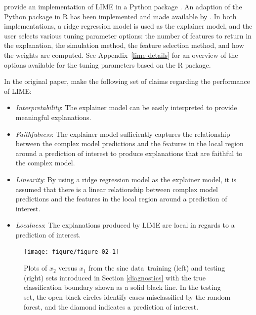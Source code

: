 \documentclass[AMS,STIX2COL]{WileyNJD-v2}\usepackage[]{graphicx}\usepackage[]{color}
\newenvironment{knitrout}{}{} %
\newcommand{\data}{sine data}
\begin{document}
\citet{ribeiro:2016} provide an implementation of LIME in a Python package \cite{ribeiro:2020}. An adaption of the Python package in R has been implemented and made available by \citet{pedersen:2020}. In both implementations, a ridge regression model is used as the explainer model, and the user  selects various tuning parameter options: the number of features to return in the explanation, the simulation method, the feature selection method, and how the weights are computed. See Appendix~\ref{lime-details} for an overview of the options available for the tuning parameters based on the R package.

In the original paper, \citet{ribeiro:2016} make the following set of claims regarding the performance of LIME:

\begin{itemize}
\item \emph{Interpretability}: The explainer model can be easily interpreted to provide meaningful explanations.
\item \emph{Faithfulness}: The explainer model sufficiently captures the relationship between the complex model predictions and the features in the local region around a prediction of interest to produce explanations that are faithful to the complex model.
\item \emph{Linearity}: By using a ridge regression model as the explainer model, it is assumed that there is a linear relationship between complex model predictions and the features in the local region around a prediction of interest.
\item \emph{Localness}: The explanations produced by LIME are local in regards to a prediction of interest.
\end{itemize}



\begin{figure}[!thp]
\centering
\begin{knitrout}
\color{fgcolor}

{\centering \texttt{[image: figure/figure-02-1]} 

}


\end{knitrout}
\caption{Plots of $x_2$ versus $x_1$ from the \data \ training (left) and testing (right) sets introduced in Section \ref{diagnostics} with the true classification boundary shown as a solid black line. In the testing set, the open black circles identify cases misclassified by the random forest, and the diamond indicates a prediction of interest.}
\label{fig:figure-02}
\end{figure}
\end{document}
